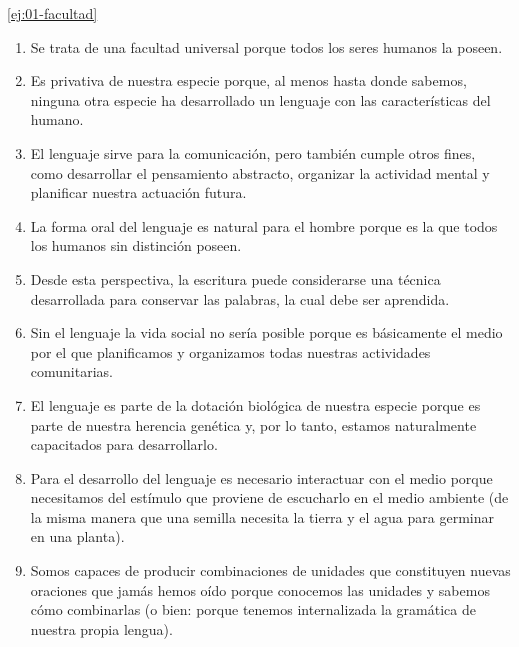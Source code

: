 \begin{solucion}{\ref{ej:01-facultad}}
\begin{enumerate}[label=\arabic*., start=2, leftmargin=2em, itemsep=.2\baselineskip]
  \item Se trata de una facultad universal porque todos los seres humanos la
        poseen.
  \item Es privativa de nuestra especie porque, al menos hasta donde sabemos,
        ninguna otra especie ha desarrollado un lenguaje con las
        características del humano.
  \item El lenguaje sirve para la comunicación, pero también cumple otros
        fines, como desarrollar el pensamiento abstracto, organizar la actividad
        mental y planificar nuestra actuación futura.
  \item La forma oral del lenguaje es natural para el hombre porque es la que
        todos los humanos sin distinción poseen.
  \item Desde esta perspectiva, la escritura puede considerarse una técnica
        desarrollada para conservar las palabras, la cual debe ser aprendida.
  \item Sin el lenguaje la vida social no sería posible porque es básicamente
        el medio por el que planificamos y organizamos todas nuestras
        actividades comunitarias.
  \item El lenguaje es parte de la dotación biológica de nuestra especie porque
        es parte de nuestra herencia genética y, por lo tanto, estamos
        naturalmente capacitados para desarrollarlo.
  \item Para el desarrollo del lenguaje es necesario interactuar con el medio
        porque necesitamos del estímulo que proviene de escucharlo en el medio
        ambiente (de la misma manera que una semilla necesita la tierra y el
        agua para germinar en una planta).
  \item Somos capaces de producir combinaciones de unidades que constituyen
        nuevas oraciones que jamás hemos oído porque conocemos las unidades y
        sabemos cómo combinarlas (o bien: porque tenemos internalizada la
        gramática de nuestra propia lengua).
\end{enumerate}
\end{solucion}

